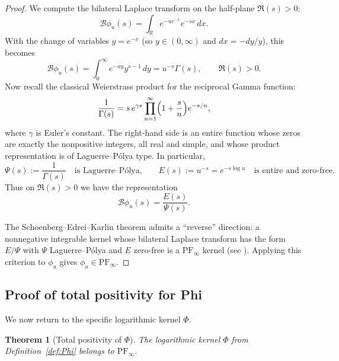 \documentclass[12pt]{amsart}
\newtheorem{theorem}{Theorem}[section]
\theoremstyle{definition}
\theoremstyle{remark}
\begin{document}
\begin{proof}
We compute the bilateral Laplace transform on the half-plane $\Re(s)>0$:
\[
\mathcal B\phi_u(s)
=
\int_{\mathbb R} e^{-u e^{-x}}e^{-s x}\,dx.
\]
With the change of variables $y=e^{-x}$ (so $y\in(0,\infty)$ and $dx=-dy/y$), this becomes
\[
\mathcal B\phi_u(s)
=
\int_0^\infty e^{-u y} y^{s-1}\,dy
=
u^{-s}\Gamma(s),
\qquad \Re(s)>0.
\]
Now recall the classical Weierstrass product for the reciprocal Gamma function:
\begin{equation}
\label{eq:invGamma-product}
\frac{1}{\Gamma(s)}
=
s\,e^{\gamma s}\prod_{n=1}^\infty\Bigl(1+\frac{s}{n}\Bigr)e^{-s/n},
\end{equation}
where $\gamma$ is Euler's constant. The right-hand side is an entire function whose
zeros are exactly the nonpositive integers, all real and simple, and whose product
representation is of Laguerre--P\'olya type. In particular,
\[
\Psi(s):=\frac{1}{\Gamma(s)}
\quad\text{is Laguerre--P\'olya,}
\qquad
E(s):=u^{-s}=e^{-s\log u}
\quad\text{is entire and zero-free.}
\]
Thus on $\Re(s)>0$ we have the representation
\[
\mathcal B\phi_u(s)=\frac{E(s)}{\Psi(s)}.
\]

The Schoenberg--Edrei--Karlin theorem admits a ``reverse'' direction:
a nonnegative integrable kernel whose bilateral Laplace transform has the form
$E/\Psi$ with $\Psi$ Laguerre--P\'olya and $E$ zero-free is a $\mathrm{PF}_\infty$
kernel (see \cite[Ch.~VII]{karlin1968total}). Applying this criterion to $\phi_u$
gives $\phi_u\in\mathrm{PF}_\infty$.
\end{proof}

\subsection{Proof of total positivity for Phi}

We now return to the specific logarithmic kernel $\Phi$.

\begin{theorem}[Total positivity of $\Phi$]
\label{thm:Phi-PF-detailed}
The logarithmic kernel $\Phi$ from Definition~\ref{def:Phi} belongs to
$\mathrm{PF}_\infty$.
\end{theorem}
\end{document}
